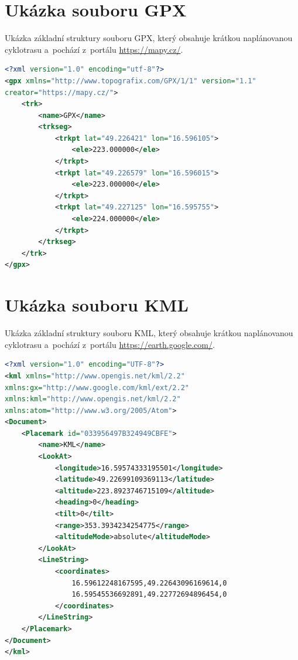 %
%

\chapter{Ukázka souboru GPX}
\label{TheGPXFileSample}

Ukázka základní struktury souboru GPX, který obsahuje krátkou naplánovanou cyklotrasu a~pochází z~portálu \url{https://mapy.cz/}.

\begin{lstlisting}[aboveskip=2em, caption={Formát souboru GPX.\protect\footnotemark}, frame=lines, label=GPXProtocol, language=XML]
<?xml version="1.0" encoding="utf-8"?>
<gpx xmlns="http://www.topografix.com/GPX/1/1" version="1.1"
creator="https://mapy.cz/">
    <trk>
        <name>GPX</name>
        <trkseg>
            <trkpt lat="49.226421" lon="16.596105">
                <ele>223.000000</ele>
            </trkpt>
            <trkpt lat="49.226579" lon="16.596015">
                <ele>223.000000</ele>
            </trkpt>
            <trkpt lat="49.227125" lon="16.595755">
                <ele>224.000000</ele>
            </trkpt>
        </trkseg>
    </trk>
</gpx>
\end{lstlisting}


\chapter{Ukázka souboru KML}
\label{TheKMLFileSample}

Ukázka základní struktury souboru KML, který obsahuje krátkou naplánovanou cyklotrasu a~pochází z~portálu \url{https://earth.google.com/}.

\begin{lstlisting}[aboveskip=2em, caption={Formát souboru KML.\protect\footnotemark}, frame=lines, label=KMLProtocol, language=XML]
<?xml version="1.0" encoding="UTF-8"?>
<kml xmlns="http://www.opengis.net/kml/2.2"
xmlns:gx="http://www.google.com/kml/ext/2.2"
xmlns:kml="http://www.opengis.net/kml/2.2"
xmlns:atom="http://www.w3.org/2005/Atom">
<Document>
    <Placemark id="033956497B324949CBFE">
        <name>KML</name>
        <LookAt>
            <longitude>16.59574333195501</longitude>
            <latitude>49.22699109369113</latitude>
            <altitude>223.8923746715109</altitude>
            <heading>0</heading>
            <tilt>0</tilt>
            <range>353.3934234254775</range>
            <altitudeMode>absolute</altitudeMode>
        </LookAt>
        <LineString>
            <coordinates>
                16.59612248167595,49.22643096169614,0
                16.59545536692891,49.22772694896454,0 
            </coordinates>
        </LineString>
    </Placemark>
</Document>
</kml>
\end{lstlisting}

